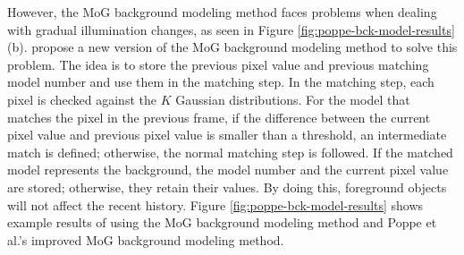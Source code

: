 However, the MoG background modeling method faces problems when dealing
with gradual illumination changes, as seen in
Figure \ref{fig:poppe-bck-model-results}(b). 
propose a new version of the MoG background modeling method to solve
this problem. The idea is to store the previous pixel value and
previous matching model number and use them in the matching step. In
the matching step, each pixel is checked against the $K$ Gaussian
distributions. For the model that matches the pixel in the previous
frame, if the difference between the current pixel value and previous
pixel value is smaller than a threshold, an intermediate match is
defined; otherwise, the normal matching step is followed. If the
matched model represents the background, the model number and the
current pixel value are stored; otherwise, they retain their
values. By doing this, foreground objects will not affect the recent
history. Figure \ref{fig:poppe-bck-model-results} shows example
results of using the MoG background modeling method and Poppe et al.'s
improved MoG background modeling method.

